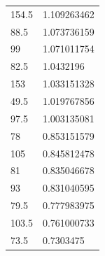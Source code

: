 \begin{longtable}{|l|l|}
 \rowcolor[HTML]{FE0000} 
 154.5                                                   & 1.109263462                                                   \\
 \rowcolor[HTML]{F8FF00} 
 88.5                                                    & 1.073736159                                                   \\
 \rowcolor[HTML]{F8FF00} 
 99                                                      & 1.071011754                                                   \\
 \rowcolor[HTML]{F8FF00} 
 82.5                                                    & 1.0432196                                                     \\
 \rowcolor[HTML]{F8FF00} 
 153                                                     & 1.033151328                                                   \\
 \rowcolor[HTML]{F8FF00} 
 49.5                                                    & 1.019767856                                                   \\
 \rowcolor[HTML]{F8FF00} 
 97.5                                                    & 1.003135081                                                   \\
 \rowcolor[HTML]{F8FF00} 
 78                                                      & 0.853151579                                                   \\
 \rowcolor[HTML]{F8FF00} 
 105                                                     & 0.845812478                                                   \\
 \rowcolor[HTML]{F8FF00} 
 81                                                      & 0.835046678                                                   \\
 \rowcolor[HTML]{F8FF00} 
 93                                                      & 0.831040595                                                   \\
 \rowcolor[HTML]{F8FF00} 
 79.5                                                    & 0.777983975                                                   \\
 \rowcolor[HTML]{F8FF00} 
 103.5                                                   & 0.761000733                                                   \\
 \rowcolor[HTML]{F8FF00} 
 73.5                                                    & 0.7303475                                                     \\

\end{longtable}
